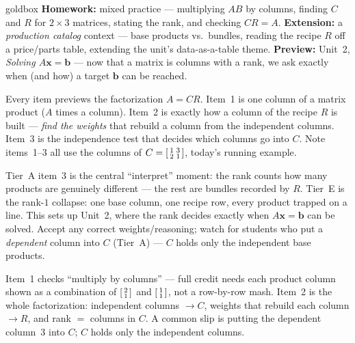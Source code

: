 \documentclass[10pt]{article}
\newcommand{\xx}{\mathbf{x}}
\newcommand{\bb}{\mathbf{b}}
\begin{document}
\begin{skillbox}{goldbox}
\textbf{Homework:} mixed practice --- multiplying $AB$ by columns, finding $C$ and $R$ for
$2\times 3$ matrices, stating the rank, and checking $CR=A$. \textbf{Extension:} a
\emph{production catalog} context --- base products vs.\ bundles, reading the recipe $R$ off a
price/parts table, extending the unit's data-as-a-table theme. \textbf{Preview:} Unit~2,
\emph{Solving $A\xx=\bb$} --- now that a matrix is columns with a rank, we ask exactly when (and
how) a target $\bb$ can be reached.
\end{skillbox}

\begin{teachernote}[Warm-Up]
Every item previews the factorization $A=CR$. Item~1 is one column of a matrix product ($A$ times a
column). Item~2 is exactly how a column of the recipe $R$ is built --- \emph{find the weights} that
rebuild a column from the independent columns. Item~3 is the independence test that decides which
columns go into $C$. Note items~1--3 all use the columns of $C=\begin{bsmallmatrix} 1&3\\2&1 \end{bsmallmatrix}$,
today's running example.
\end{teachernote}

\begin{teachernote}
Tier~A item~3 is the central ``interpret'' moment: the rank counts how many products are genuinely
different --- the rest are bundles recorded by $R$. Tier~E is the rank-$1$ collapse: one base column,
one recipe row, every product trapped on a line. This sets up Unit~2, where the rank decides exactly
when $A\xx=\bb$ can be solved. Accept any correct weights/reasoning; watch for students who put a
\emph{dependent} column into $C$ (Tier~A) --- $C$ holds only the independent base products.
\end{teachernote}

\begin{teachernote}
Item~1 checks ``multiply by columns'' --- full credit needs each product column shown as a
combination of $\begin{bsmallmatrix} 2\\1 \end{bsmallmatrix}$ and $\begin{bsmallmatrix} 1\\1 \end{bsmallmatrix}$,
not a row-by-row mash. Item~2 is the whole factorization: independent columns $\to C$, weights that
rebuild each column $\to R$, and rank $=$ columns in $C$. A common slip is putting the dependent
column~3 into $C$; $C$ holds only the independent columns.
\end{teachernote}
\end{document}
